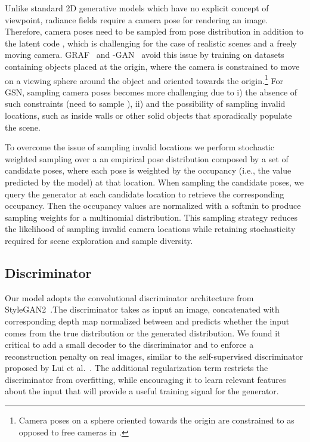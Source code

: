 \documentclass[10pt,twocolumn,letterpaper]{article}
\begin{document}
Unlike standard 2D generative models which have no explicit concept of viewpoint, radiance fields require a camera pose for rendering an image. Therefore, camera poses  need to be sampled from pose distribution  in addition to the latent code , which is challenging for the case of realistic scenes and a freely moving camera. GRAF~\cite{graf} and -GAN~\cite{pigan} avoid this issue by training on datasets containing objects placed at the origin, where the camera is constrained to move on a viewing sphere around the object and oriented towards the origin.\footnote{Camera poses  on a sphere oriented towards the origin are constrained to  as opposed to free cameras in .} For GSN, sampling camera poses becomes more challenging due to i) the absence of such constraints (\ie need to sample ), ii) and the possibility of sampling invalid locations, such as inside walls or other solid objects that sporadically populate the scene.

To overcome the issue of sampling invalid locations we perform stochastic weighted sampling over a an empirical pose distribution  composed by a set of candidate poses, where each pose is weighted by the occupancy (i.e., the  value predicted by the model) at that location. When sampling the candidate poses, we query the generator at each candidate location to retrieve the corresponding occupancy. Then the occupancy values are normalized with a softmin to produce sampling weights for a multinomial distribution. This sampling strategy reduces the likelihood of sampling invalid camera locations while retaining stochasticity required for scene exploration and sample diversity.

\subsection{Discriminator}

Our model adopts the convolutional discriminator architecture from StyleGAN2~\cite{stylegan2}.The discriminator takes as input an image, concatenated with corresponding depth map normalized between  
and predicts whether the input comes from the true distribution or the generated distribution. We found it critical to add a small decoder  to the discriminator and to enforce a reconstruction penalty on real images, similar to the self-supervised discriminator proposed by Lui et al.~\cite{self_supervised_discriminator}. The additional regularization term restricts the discriminator from overfitting, while encouraging it to learn relevant features about the input that will provide a useful training signal for the generator.
\end{document}

